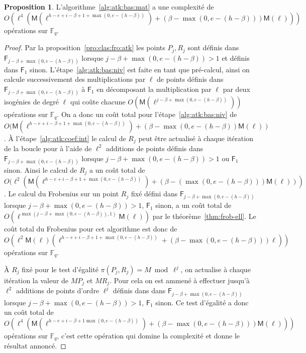 \documentclass[10pt,a4paper]{book}
\theoremstyle{plain}
\theoremstyle{definition}
\theoremstyle{definition}
\theoremstyle{definition}
\newtheorem{prop}[thm]{Proposition}
\theoremstyle{definition}
\theoremstyle{remark}
\theoremstyle{remark}
\theoremstyle{definition}
\begin{document}
\begin{prop}
\label{pro:atk:comp:alg}
L'algorithme~\ref{alg:atk:bas:mat} a une complexité de 
\[
O(\ell^4(\mathsf{M}(\ell^{h-e+i-\beta+1+\max(0,e-(h-\beta))})+(\beta-\max(0,e-(h-\beta)))\mathsf{M}(\ell)))
\]
opérations sur $\mathbb{F}_q$.
\end{prop}

\begin{proof}
Par la proposition~\ref{pro:clas:fro:atk} les points $P_j,R_j$ sont définis
dans $\mathsf{F}_{j-\beta+\max(0,e-(h-\beta))}$ lorsque $j-\beta+\max(0,e-(h-\beta))>1$ et 
définis dans $\mathsf{F}_1$ sinon. L'étape~\ref{alg:atk:bas:niv} est faite en 
tant que pré-calcul, ainsi on calcule successivement des multiplications par 
$\ell$ de points définis dans $\mathsf{F}_{j-\beta+\max(0,e-(h-\beta))}$ à 
$\mathsf{F}_{1}$ en décomposant la multiplication par $\ell$ par deux isogénies
de degré $\ell$ qui coûte chacune $O(\mathsf{M}(\ell^{j-\beta+\max(0,e-
(h-\beta))}))$ opérations sur $\mathbb{F}_q$. On a donc un coût total pour 
l'étape~\ref{alg:atk:bas:niv} de $O(\mathsf{M}(\ell^{h-e+i-\beta+1+\max(0,e-
(h-\beta))})+(\beta-\max(0,e-(h-\beta))\mathsf{M}(\ell))$.
\`A l'étape~\ref{alg:atk:coef:int} le calcul de $R_j$ peut être actualisé à 
chaque itération de la boucle pour à l'aide 
de $\ell^2$ additions de points définis dans $\mathsf{F}_{j-\beta+\max(0,e-(h-\beta))}$ 
lorsque $j-\beta+\max(0,e-(h-\beta))>1$ ou $\mathsf{F}_1$ sinon. Ainsi le calcul de $R_j$ a 
un coût total de 
$O(\ell^{2}(\mathsf{M}(\ell^{h-e+i-\beta+1+\max(0,e-(h-\beta))})+(\beta-(\max(0,e-(h-\beta)))\mathsf{M}(\ell)))$. 
Le calcul du Frobenius sur un point $R_j$ fixé défini dans 
$\mathsf{F}_{j-\beta+\max(0,e-(h-\beta))}$ lorsque $j-\beta+\max(0,e-(h-\beta))>1$, 
$\mathsf{F}_1$ sinon, a un coût total de $O(\ell^{\max(j-\beta+\max(0,e-(h-\beta)),1)}
\mathsf{M}(\ell))$ par le théorème~\ref{thm:frob-ell}. Le coût total du 
Frobenius pour cet algorithme est donc de 
$O(\ell^2\mathsf{M}(\ell)(\ell^{h-e+i-\beta+1+\max(0,e-(h-\beta))}+(\beta-\max(0,e-(h-\beta)))\ell))$ 
opérations sur $\mathbb{F}_q$.

\`A $R_j$ fixé pour le test d'égalité $\pi(P_j,R_j)= M \bmod \ell^j$, on 
actualise à chaque itération la valeur de $MP_j$ et $MR_j$. Pour cela on est 
ammené à effectuer jusqu'à $\ell^2$ additions de points d'ordre 
$\ell^{j}$ définis dans dans $\mathsf{F}_{j-\beta+\max(0,e-(h-\beta))}$ lorsque $j-\beta+\max(0,e-(h-\beta))>1$, 
$\mathsf{F}_1$ sinon. Ce test d'égalité a donc un coût total de 
$O(\ell^4(\mathsf{M}(\ell^{h-e+i-\beta+1\max(0,e-(h-\beta))})+(\beta-\max(0,e-(h-\beta)))\mathsf{M}(\ell)))$ 
opérations sur $\mathbb{F}_q$, c'est cette opération qui domine la complexité
et donne le résultat annoncé.
\end{proof}
\end{document}
